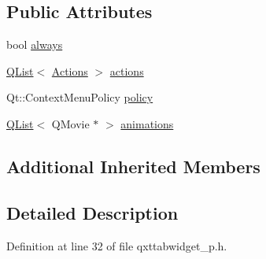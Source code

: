\subsection*{Public Attributes}
\begin{DoxyCompactItemize}
\item 
bool \hyperlink{class_qxt_tab_widget_private_aa3f0f38a8199acffb62b94e4b4f505b2}{always}
\item 
\hyperlink{class_q_list}{Q\-List}$<$ \hyperlink{qxttabwidget__p_8h_adcf6b263c4c4d3f5db8935bd2e41d66d}{Actions} $>$ \hyperlink{class_qxt_tab_widget_private_a992905f500e6bad95807a882853e0189}{actions}
\item 
Qt\-::\-Context\-Menu\-Policy \hyperlink{class_qxt_tab_widget_private_a60d14c7d6c25035845d3d5439f9bf936}{policy}
\item 
\hyperlink{class_q_list}{Q\-List}$<$ Q\-Movie $\ast$ $>$ \hyperlink{class_qxt_tab_widget_private_aacbbb74213ffde0c6f6f00dec7b62d03}{animations}
\end{DoxyCompactItemize}
\subsection*{Additional Inherited Members}


\subsection{Detailed Description}


Definition at line 32 of file qxttabwidget\-\_\-p.\-h.



